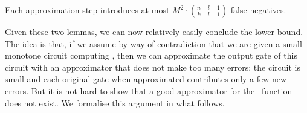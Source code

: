 \begin{lemma}\label{lem:new-false-negatives}
Each approximation step introduces at most $M^2 \cdot\binom{n-l-1}{k-l-1}$ false negatives.
\end{lemma}


Given these two lemmas, we can now relatively easily conclude the lower bound. The idea is that, if we assume by way of contradiction that we are given a small monotone circuit computing \cliquenk, then we can approximate the output gate of this circuit with an approximator that does not make too many errors: the circuit is small and each original gate when approximated contributes only a few new errors. But it is not hard to show that a good approximator for the \cliquenk\ function does not exist. We formalise this argument in what follows.





\bigskip









